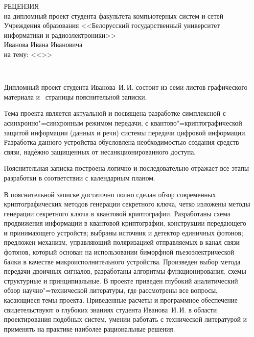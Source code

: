 
\thispagestyle{empty}

%

\begin{singlespace}

{\small
  \begin{center}
    \begin{minipage}{0.9\textwidth}
      \begin{center}
        {\normalsize РЕЦЕНЗИЯ}\\[0.2cm]
        на дипломный проект студента факультета компьютерных систем и сетей Учреждения образования <<Белорусский государственный университет информатики и радиоэлектроники>>\\
        Иванова Ивана Ивановича\\
        на тему: <<\topicName>>
      \end{center}
    \end{minipage}\\
  \end{center}

Дипломный проект студента Иванова~И.\,И. состоит из семи листов графического материала и~\pageref*{LastPage} страницы пояснительной записки.

Тема проекта является актуальной и посвящена разработке симплексной с асинхронно"=синхронным режимом передачи, с квантово"=криптографической защитой информации (данных и речи) системы передачи цифровой информации. 
Разработка данного устройства обусловлена необходимостью создания средств связи, надѐжно защищенных от несанкционированного доступа.

Пояснительная записка построена логично и последовательно отражает все этапы разработки в соответствии с календарным планом.

В пояснительной записке достаточно полно сделан обзор современных криптографических методов генерации секретного ключа, четко изложены методы генерации секретного
ключа в квантовой криптографии.
Разработаны схема продвижения информации в квантовой криптографии, конструкции передающего и принимающего устройств; выбраны источник и детектор единичных фотонов; предложен механизм, управляющий поляризацией отправляемых в канал связи фотонов, который основан на использовании биморфной пьезоэлектрической балки в качестве микроисполнительного устройства. 
Произведен выбор метода передачи двоичных сигналов, разработаны алгоритмы функционирования, схемы структурные и принципиальные.
В проекте приведен глубокий аналитический обзор научно"=технической литературы, где рассмотрены все вопросы, касающиеся темы проекта.
Приведенные расчеты и программное обеспечение свидетельствуют о глубоких знаниях студента Иванова~И.\,И. в области проектирования подобных систем, умении работать с технической литературой и применять на практике наиболее рациональные решения.

}
\end{singlespace}
